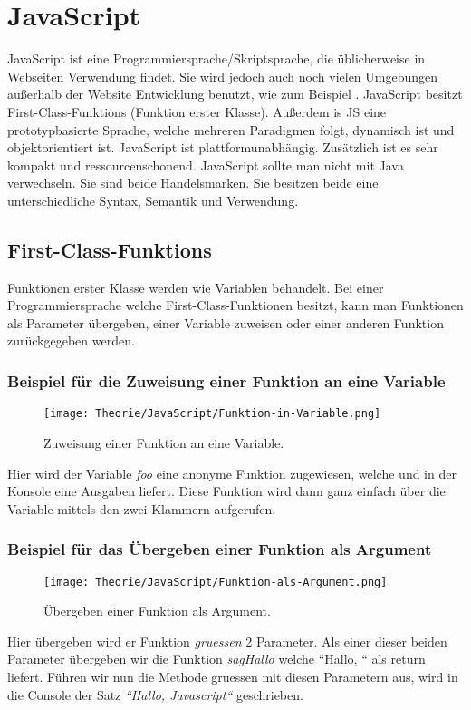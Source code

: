 \section{JavaScript}
\label{js}

JavaScript ist eine Programmiersprache/Skriptsprache, die üblicherweise in Webseiten Verwendung findet. Sie wird jedoch auch noch vielen Umgebungen außerhalb der Website Entwicklung benutzt, 
wie zum Beispiel .
JavaScript besitzt First-Class-Funktions (Funktion erster Klasse). Außerdem is JS eine prototypbasierte Sprache, welche mehreren Paradigmen folgt, dynamisch ist und 
objektorientiert ist. JavaScript ist plattformunabhängig. Zusätzlich ist es sehr kompakt und ressourcenschonend. 
JavaScript sollte man nicht mit Java verwechseln. Sie sind beide Handelsmarken. Sie besitzen beide eine unterschiedliche Syntax, Semantik und Verwendung.~\cite{JS}

\subsection{First-Class-Funktions}
Funktionen erster Klasse werden wie Variablen behandelt. Bei einer Programmiersprache welche First-Class-Funktionen besitzt, kann man Funktionen als Parameter übergeben, einer Variable zuweisen oder
einer anderen Funktion zurückgegeben werden.
\pagebreak

\begin{center}
    \subsubsection{Beispiel für die Zuweisung einer Funktion an eine Variable}
\begin{figure}[htbp]
    \centerline{\texttt{[image: Theorie/JavaScript/Funktion-in-Variable.png]}}
    \caption{Zuweisung einer Funktion an eine Variable.~\cite{First-Class-Funktion}}
\end{figure}
\end{center}
Hier wird der Variable \textit{foo} eine anonyme Funktion zugewiesen, welche und in der Konsole eine Ausgaben liefert.
Diese Funktion wird dann ganz einfach über die Variable mittels den zwei Klammern aufgerufen.


\begin{center}
    \subsubsection{Beispiel für das Übergeben einer Funktion als Argument}
\begin{figure}[htbp]
    \centerline{\texttt{[image: Theorie/JavaScript/Funktion-als-Argument.png]}}
    \caption{Übergeben einer Funktion als Argument.~\cite{First-Class-Funktion}}
\end{figure}
\end{center}
Hier übergeben wird er Funktion \textit{gruessen} 2 Parameter. Als einer dieser beiden Parameter übergeben wir die Funktion \textit{sagHallo} welche ``Hallo, `` als return liefert.
Führen wir nun die Methode gruessen mit diesen Parametern aus, wird in die Console der Satz \textit{``Hallo, Javascript``} geschrieben.
\pagebreak

